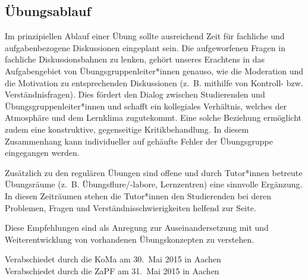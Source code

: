 \documentclass[DIV=calc]{scrartcl}
\renewcommand{\headrulewidth}{0pt}
\begin{document}
\subsection*{Übungsablauf}
Im prinzipiellen Ablauf einer Übung sollte ausreichend Zeit für fachliche und
aufgabenbezogene Diskussionen eingeplant sein. Die aufgeworfenen Fragen in
fachliche Diskussionsbahnen zu lenken, gehört unseres Erachtens in das
Aufgabengebiet von Übungsgruppenleiter*innen genauso, wie die Moderation und
die Motivation zu entsprechenden Diskussionen (z.~B. mithilfe von Kontroll-
bzw. Verständnisfragen). Dies fördert den Dialog zwischen Studierenden und
Übungsgruppenleiter*innen und schafft ein kollegiales Verhältnis, welches der
Atmosphäre und dem Lernklima zugutekommt. Eine solche Beziehung ermöglicht
zudem eine konstruktive, gegenseitige Kritikbehandlung. In diesem Zusammenhang
kann individueller auf gehäufte Fehler der Übungsgruppe eingegangen werden.

Zusätzlich zu den regulären Übungen sind offene und durch Tutor*innen betreute
Übungsräume (z.~B. Übungsflure/-labore, Lernzentren) eine sinnvolle Ergänzung.
In diesen Zeiträumen stehen die Tutor*innen den Studierenden bei deren
Problemen, Fragen und Verständnisschwierigkeiten helfend zur Seite.

\vspace{1cm}
Diese Empfehlungen sind als Anregung zur Auseinandersetzung mit und Weiterentwicklung von vorhandenen Übungskonzepten zu verstehen.

\vfill
\begin{flushright}
Verabschiedet durch die KoMa am 30.~Mai 2015 in Aachen\\
Verabschiedet durch die ZaPF am 31.~Mai 2015 in Aachen
\end{flushright}
\end{document}
